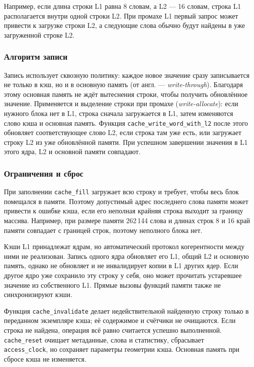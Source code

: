 \documentclass[12pt,a4paper]{article}
\begin{document}
Например, если длина строки L1 равна 8 словам, а L2 --- 16 словам, строка L1 располагается внутри одной строки L2. При промахе L1 первый запрос может привести к загрузке строки L2, а следующие слова обычно будут найдены в уже загруженной строке L2.

\subsubsection{Алгоритм записи}

Запись использует сквозную политику: каждое новое значение сразу записывается не только в кэш, но и в основную память (от англ. --- \textit{write-through}). Благодаря этому основная память не ждёт вытеснения строки, чтобы получить обновлённое значение. Применяется и выделение строки при промахе (\textit{write-allocate}): если нужного блока нет в L1, строка сначала загружается в L1, затем изменяются слово кэша и основная память. Функция \texttt{cache\_write\_word\_with\_l2} после этого обновляет соответствующее слово L2, если строка там уже есть, или загружает строку L2 из уже обновлённой памяти. При успешном завершении значения в L1 этого ядра, L2 и основной памяти совпадают.

\subsubsection{Ограничения и сброс}

При заполнении \texttt{cache\_fill} загружает всю строку и требует, чтобы весь блок помещался в памяти. Поэтому допустимый адрес последнего слова памяти может привести к ошибке кэша, если его неполная крайняя строка выходит за границу массива. Например, при размере памяти 262\,144 слова и длинах строк 8 и 16 край памяти совпадает с границей строк, поэтому неполного блока нет.

Кэши L1 принадлежат ядрам, но автоматический протокол когерентности между ними не реализован. Запись одного ядра обновляет его L1, общий L2 и основную память, однако не обновляет и не инвалидирует копии в L1 других ядер. Если другое ядро уже сохранило эту строку у себя, оно может прочитать устаревшее значение из собственного L1. Прямые вызовы функций памяти также не синхронизируют кэши.

Функция \texttt{cache\_invalidate} делает недействительной найденную строку только в переданном экземпляре кэша; её содержимое и счётчики не очищаются. Если строка не найдена, операция всё равно считается успешно выполненной. \texttt{cache\_reset} очищает метаданные, слова и статистику, сбрасывает \texttt{access\_clock}, но сохраняет параметры геометрии кэша. Основная память при сбросе кэша не изменяется.
\end{document}

